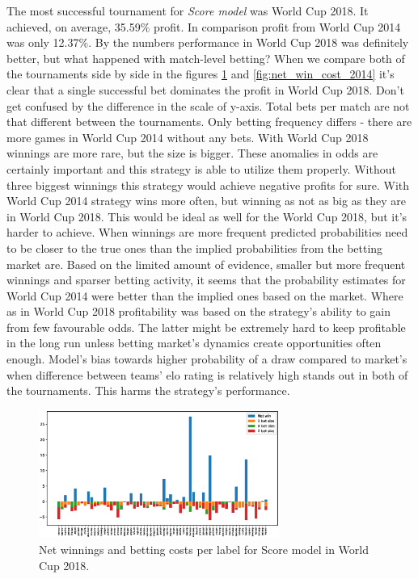 The most successful tournament for \textit{Score model} was World Cup 2018. It achieved, on average, 35.59\% profit. In comparison profit from World Cup 2014 was only 12.37\%. By the numbers performance in World Cup 2018 was definitely better, but what happened with match-level betting? When we compare both of the tournaments side by side in the figures \ref{fig:net_win_cost_2018} and \ref{fig:net_win_cost_2014} it's clear that a single successful bet dominates the profit in World Cup 2018. Don't get confused by the difference in the scale of y-axis. Total bets per match are not that different between the tournaments. Only betting frequency differs - there are more games in World Cup 2014 without any bets. With World Cup 2018 winnings are more rare, but the size is bigger. These anomalies in odds are certainly important and this strategy is able to utilize them properly. Without three biggest winnings this strategy would achieve negative profits for sure. With World Cup 2014 strategy wins more often, but winning as not as big as they are in World Cup 2018. This would be ideal as well for the World Cup 2018, but it's harder to achieve. When winnings are more frequent predicted probabilities need to be closer to the true ones than the implied probabilities from the betting market are. Based on the limited amount of evidence, smaller but more frequent winnings and sparser betting activity, it seems that the probability estimates for World Cup 2014 were better than the implied ones based on the market. Where as in World Cup 2018 profitability was based on the strategy's ability to gain from few favourable odds. The latter might be extremely hard to keep profitable in the long run unless betting market's dynamics create opportunities often enough. Model's bias towards higher probability of a draw compared to market's when difference between teams' elo rating is relatively high stands out in both of the tournaments. This harms the strategy's performance.

\begin{figure}[H]
    \centering
    \includegraphics[width=0.7\textwidth]{img/match_level_2018_score_win_cost_.eps}
    \caption{Net winnings and betting costs per label for Score model in World Cup 2018.}
    \label{fig:net_win_cost_2018}
\end{figure}

